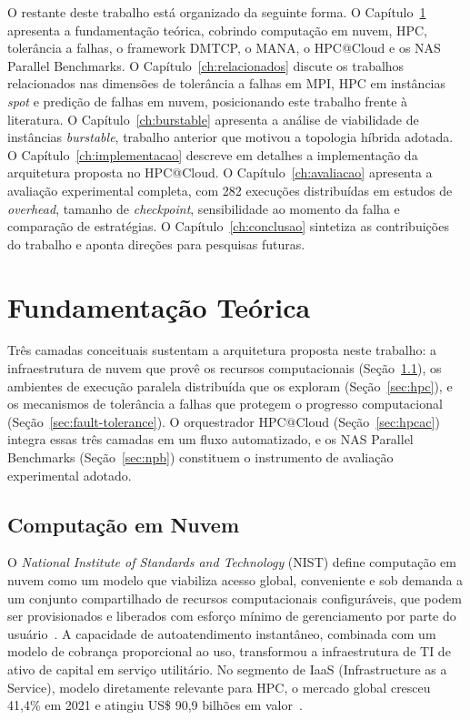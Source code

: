 O restante deste trabalho está organizado da seguinte forma. O
Capítulo~\ref{ch:fundamentacao} apresenta a fundamentação teórica, cobrindo computação
em nuvem, HPC, tolerância a falhas, o framework DMTCP, o MANA, o HPC@Cloud e os NAS
Parallel Benchmarks. O Capítulo~\ref{ch:relacionados} discute os trabalhos relacionados
nas dimensões de tolerância a falhas em MPI, HPC em instâncias \textit{spot} e predição
de falhas em nuvem, posicionando este trabalho frente à literatura. O
Capítulo~\ref{ch:burstable} apresenta a análise de viabilidade de instâncias
\textit{burstable}, trabalho anterior que motivou a topologia híbrida adotada. O
Capítulo~\ref{ch:implementacao} descreve em detalhes a implementação da arquitetura
proposta no HPC@Cloud. O Capítulo~\ref{ch:avaliacao} apresenta a avaliação
experimental completa, com 282 execuções distribuídas em estudos de \textit{overhead}, tamanho
de \textit{checkpoint}, sensibilidade ao momento da falha e comparação de estratégias.
O Capítulo~\ref{ch:conclusao} sintetiza as contribuições do trabalho e aponta direções
para pesquisas futuras.


\chapter{Fundamentação Teórica}
\label{ch:fundamentacao}

Três camadas conceituais sustentam a arquitetura proposta neste trabalho: a
infraestrutura de nuvem que provê os recursos computacionais
(Seção~\ref{sec:cloud}), os ambientes de execução paralela distribuída que os
exploram (Seção~\ref{sec:hpc}), e os mecanismos de tolerância a falhas que
protegem o progresso computacional (Seção~\ref{sec:fault-tolerance}). O
orquestrador HPC@Cloud (Seção~\ref{sec:hpcac}) integra essas três camadas em um
fluxo automatizado, e os NAS Parallel Benchmarks (Seção~\ref{sec:npb}) constituem
o instrumento de avaliação experimental adotado.

\section{Computação em Nuvem}
\label{sec:cloud}

O \textit{National Institute of Standards and Technology} (NIST) define computação
em nuvem como um modelo que viabiliza acesso global, conveniente e sob demanda a um
conjunto compartilhado de recursos computacionais configuráveis, que podem ser
provisionados e liberados com esforço mínimo de gerenciamento por parte do
usuário~\cite{mell2011nist}. A capacidade de autoatendimento instantâneo, combinada
com um modelo de cobrança proporcional ao uso, transformou a infraestrutura de TI de
ativo de capital em serviço utilitário. No segmento de IaaS (Infrastructure as a
Service), modelo diretamente relevante para HPC, o mercado global cresceu 41,4\% em
2021 e atingiu US\$ 90,9 bilhões em valor~\cite{gartner2022iaas}.

